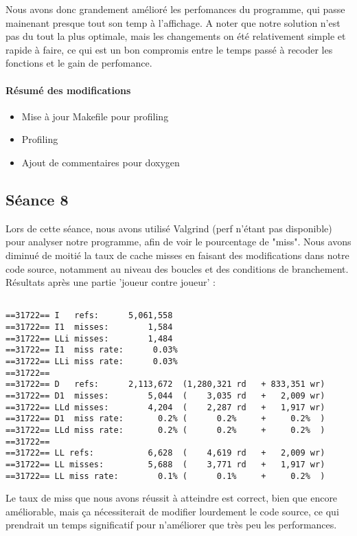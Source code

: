\documentclass{article}
\begin{document}
Nous avons donc grandement amélioré les perfomances du programme, qui passe mainenant presque tout son temp à l'affichage. A noter que notre solution n'est pas du tout la plus optimale, mais les changements on été relativement simple et rapide à faire, ce qui est un bon compromis entre le temps passé à recoder les fonctions et le gain de perfomance.

\paragraph{Résumé des modifications}
\begin{itemize}
\item Mise à jour Makefile pour profiling
\item Profiling
\item Ajout de commentaires pour doxygen
\end{itemize}

\subsection{Séance 8}
Lors de cette séance, nous avons utilisé Valgrind (perf n'étant pas disponible) pour analyser notre programme, afin de voir le pourcentage de "miss".
Nous avons diminué de moitié la taux de cache misses en faisant des modifications dans notre code source, notamment au niveau des boucles et des conditions de branchement.
Résultats après une partie 'joueur contre joueur' :
\begin{scriptsize}
\begin{lstlisting}

==31722== I   refs:      5,061,558
==31722== I1  misses:        1,584
==31722== LLi misses:        1,484
==31722== I1  miss rate:      0.03%
==31722== LLi miss rate:      0.03%
==31722== 
==31722== D   refs:      2,113,672  (1,280,321 rd   + 833,351 wr)
==31722== D1  misses:        5,044  (    3,035 rd   +   2,009 wr)
==31722== LLd misses:        4,204  (    2,287 rd   +   1,917 wr)
==31722== D1  miss rate:       0.2% (      0.2%     +     0.2%  )
==31722== LLd miss rate:       0.2% (      0.2%     +     0.2%  )
==31722== 
==31722== LL refs:           6,628  (    4,619 rd   +   2,009 wr)
==31722== LL misses:         5,688  (    3,771 rd   +   1,917 wr)
==31722== LL miss rate:        0.1% (      0.1%     +     0.2%  )

\end{lstlisting}
\end{scriptsize}
Le taux de miss que nous avons réussit à atteindre est correct, bien que encore améliorable, mais ça nécessiterait de modifier lourdement le code source, ce qui prendrait un temps significatif pour n'améliorer que très peu les performances.
 
\end{document}

